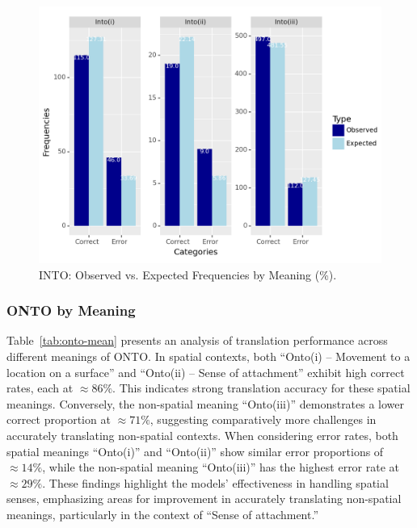 \begin{figure}[htb]
        \centering
        \includegraphics[width=.8\textwidth]{textual/Figuras/Results/Unknown-81.png}
        \caption{INTO: Observed vs. Expected Frequencies by Meaning (\%).}
        \label{fig: into-mean-chi}
\end{figure}

\subsubsection{ONTO by Meaning}

Table~\ref{tab:onto-mean} presents an analysis of translation performance across different meanings of ONTO. In spatial contexts, both ``Onto(i) -- Movement to a location on a surface'' and ``Onto(ii) -- Sense of attachment'' exhibit high correct rates, each at $\approx86\%$. This indicates strong translation accuracy for these spatial meanings. Conversely, the non-spatial meaning ``Onto(iii)'' demonstrates a lower correct proportion at $\approx71\%$, suggesting comparatively more challenges in accurately translating non-spatial contexts. When considering error rates, both spatial meanings ``Onto(i)'' and ``Onto(ii)'' show similar error proportions of $\approx14\%$, while the non-spatial meaning ``Onto(iii)'' has the highest error rate at $\approx29\%$. These findings highlight the models' effectiveness in handling spatial senses, emphasizing areas for improvement in accurately translating non-spatial meanings, particularly in the context of ``Sense of attachment.''

